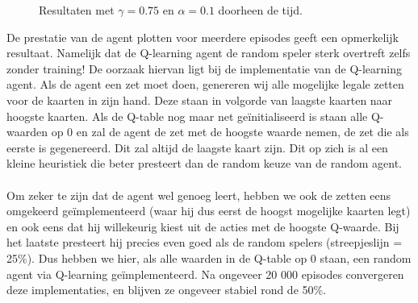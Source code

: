 \documentclass[11pt]{article}
\begin{document}
\begin{figure}[H]
    \centering
    \qquad
    \caption{Resultaten met $\gamma = 0.75$ en $\alpha = 0.1$ doorheen de tijd.}
    \label{fig:q_table_is_a_heuristic_player}
\end{figure}
\noindent De prestatie van de agent plotten voor meerdere episodes geeft een opmerkelijk resultaat. Namelijk dat de Q-learning agent de random speler sterk overtreft zelfs zonder training! De oorzaak hiervan ligt bij de implementatie van de Q-learning agent. Als de agent een zet moet doen, genereren wij alle mogelijke legale zetten voor de kaarten in zijn hand. Deze staan in volgorde van laagste kaarten naar hoogste kaarten. Als de Q-table nog maar net geïnitialiseerd is staan alle Q-waarden op 0 en zal de agent de zet met de hoogste waarde nemen, de zet die als eerste is gegenereerd. Dit zal altijd de laagste kaart zijn. Dit op zich is al een kleine heuristiek die beter presteert dan de random keuze van de random agent. \\\\
Om zeker te zijn dat de agent wel genoeg leert, hebben we ook de zetten eens omgekeerd geïmplementeerd (waar hij dus eerst de hoogst mogelijke kaarten legt) en ook eens dat hij willekeurig kiest uit de acties met de hoogste Q-waarde. Bij het laatste presteert hij precies even goed als de random spelers (streepjeslijn = 25\%). Dus hebben we hier, als alle waarden in de Q-table op 0 staan, een random agent via Q-learning geïmplementeerd. Na ongeveer 20 000 episodes convergeren deze implementaties, en blijven ze ongeveer stabiel rond de 50\%.
\end{document}
